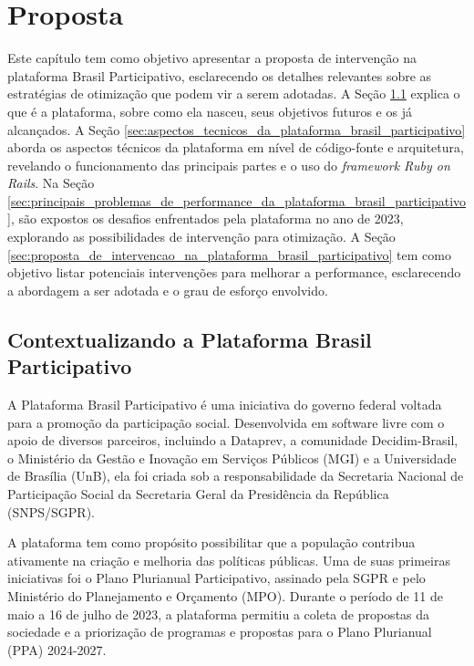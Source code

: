 \chapter{Proposta}

Este capítulo tem como objetivo apresentar a proposta de intervenção na plataforma Brasil Participativo, esclarecendo os detalhes relevantes sobre as estratégias de otimização que podem vir a serem adotadas. A Seção \ref{sec:contextualizando_a_plataforma_brasil_participativo} explica o que é a plataforma, sobre como ela nasceu, seus objetivos futuros e os já alcançados. A Seção \ref{sec:aspectos_tecnicos_da_plataforma_brasil_participativo} aborda os aspectos técnicos da plataforma em nível de código-fonte e arquitetura, revelando o funcionamento das principais partes e o uso do \textit{framework Ruby on Rails}. Na Seção \ref{sec:principais_problemas_de_performance_da_plataforma_brasil_participativo}, são expostos os desafios enfrentados pela plataforma no ano de 2023, explorando as possibilidades de intervenção para otimização. A Seção \ref{sec:proposta_de_intervencao_na_plataforma_brasil_participativo} tem como objetivo listar potenciais intervenções para melhorar a performance, esclarecendo a abordagem a ser adotada e o grau de esforço envolvido.

\section{Contextualizando a Plataforma Brasil Participativo}
\label{sec:contextualizando_a_plataforma_brasil_participativo}

A Plataforma Brasil Participativo é uma iniciativa do governo federal voltada para a promoção da participação social. Desenvolvida em software livre com o apoio de diversos parceiros, incluindo a Dataprev, a comunidade Decidim-Brasil, o Ministério da Gestão e Inovação em Serviços Públicos (MGI) e a Universidade de Brasília (UnB), ela foi criada sob a responsabilidade da Secretaria Nacional de Participação Social da Secretaria Geral da Presidência da República (SNPS/SGPR).

A plataforma tem como propósito possibilitar que a população contribua ativamente na criação e melhoria das políticas públicas. Uma de suas primeiras iniciativas foi o Plano Plurianual Participativo, assinado pela SGPR e pelo Ministério do Planejamento e Orçamento (MPO). Durante o período de 11 de maio a 16 de julho de 2023, a plataforma permitiu a coleta de propostas da sociedade e a priorização de programas e propostas para o Plano Plurianual (PPA) 2024-2027.

